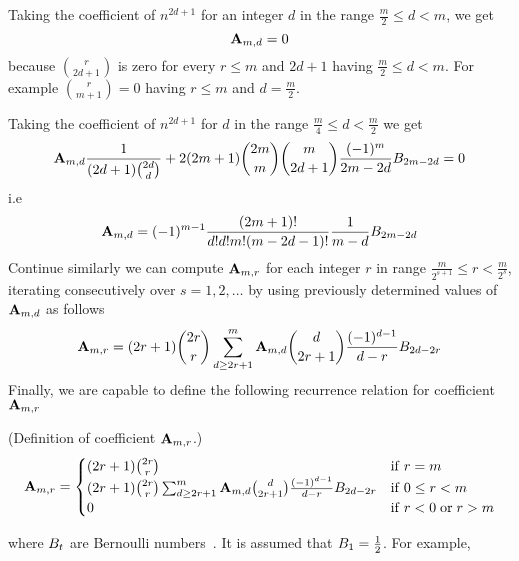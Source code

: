Taking the coefficient of $n^{2d+1}$ for an integer $d$ in the range $\frac{m}{2} \leq d < m$, we get
\begin{equation*}
    {\mathbf{A}} \sb{m,d} = 0
\end{equation*}
because $\binom{r}{2d+1}$ is zero for every $r \leq m$ and $2d+1$ having $\frac{m}{2} \leq d < m$.
For example $\binom{r}{m+1} = 0$ having $r \leq m$ and $d=\frac{m}{2}$.

Taking the coefficient of $n^{2d+1}$ for $d$ in the range $\frac{m}{4} \leq d < \frac{m}{2}$ we get
\begin{equation*}
    {\mathbf{A}} \sb{m,d} \frac{1}{(2d+1) \binom{2d}{d}}
    +2 (2m+1) \binom{2m}{m}\binom{m}{2d+1} \frac{(-1)^m}{2m-2d} {B}\sb{2m-2d} = 0
\end{equation*}
i.e
\begin{equation*}
    {\mathbf{A}} \sb{m,d} = (-1)^{m-1} \frac{(2m+1)!}{d!d!m!(m-2d-1)!} \frac{1}{m-d} {B}\sb{2m-2d}
\end{equation*}
Continue similarly we can compute ${\mathbf{A}} \sb{m,r}$ for each integer $r$ in range $\frac{m}{2^{s+1}} \leq r < \frac{m}{2^{s}}$,
iterating consecutively over $s=1,2,\ldots$ by using previously determined values of ${\mathbf{A}} \sb{m,d}$ as follows
\begin{equation*}
    {\mathbf{A}} \sb{m,r} =
    (2r+1) \binom{2r}{r} \sum_{d \geq 2r+1}^{m} {\mathbf{A}} \sb{m,d} \binom{d}{2r+1} \frac{(-1)^{d-1}}{d-r}
    {B}\sb{2d-2r}
\end{equation*}
Finally, we are capable to define the following recurrence relation for coefficient ${\mathbf{A}} \sb{m,r}$
\begin{defn} (Definition of coefficient ${\mathbf{A}} \sb{m,r}$.)
    \begin{equation}
        \label{eq:definition_coefficient_a}
        {\mathbf{A}} \sb{m,r} =
        \begin{cases}
        (2r+1)
            \binom{2r}{r} & \mathrm{if} \; r=m \\
            (2r+1) \binom{2r}{r} \sum_{d \geq 2r+1}^{m} {\mathbf{A}} \sb{m,d} \binom{d}{2r+1} \frac{(-1)^{d-1}}{d-r}
            {B}\sb{2d-2r} & \mathrm{if} \; 0 \leq r<m \\
            0 & \mathrm{if} \; r<0 \; \mathrm{or} \; r>m
        \end{cases}
    \end{equation}
\end{defn}
where ${B}\sb{t}$ are Bernoulli numbers~\cite{bateman1953higher}.
It is assumed that ${B}\sb{1}=\frac{1}{2}$.
For example,

